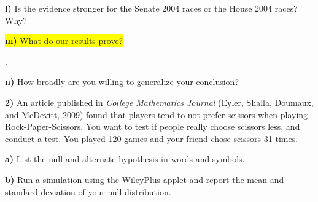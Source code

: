 \documentclass{article}
\newif\ifPrintSolution
\newcommand{\sol}[1]{\ifPrintSolution {\color{blue} #1 } \fi}
\begin{document}
\hspace{0.1in} \textbf{l) } Is the evidence stronger for the Senate 2004 races or the House 2004 races? Why?

\sol{The evidence is stronger for the House races - this is because the sample size is significantly larger (279 compared to 32)}


\vspace{0.25in}

\hspace{0.1in} \colorbox{yellow}{\textbf{m) } What do our results prove?}

\sol{Our results \textbf{do not prove anything}, but provide (strong) strong evidence that the proportion of candidates that appear more competent who win their election is not 50$\%$}.

\vspace{0.25in} 

\hspace{0.1in} \textbf{n) } How broadly are you willing to generalize your conclusion?

\sol{This result is specific to naive voters at Princeton University and cannot be generalized outside of that population based solely on these results. Princeton Students may not be representative of the total voting population to determine elections.}

\pagebreak

\textbf{2) } An article published in \textit{College Mathematics Journal} (Eyler, Shalla, Doumaux, and McDevitt, 2009) found that players tend to not prefer scissors when playing Rock-Paper-Scissors. You want to test if people really choose scissors less, and conduct a test. You played 120 games and your friend chose scissors 31 times.

\hspace{0.1in} \textbf{a) } List the null and alternate hypothesis in words and symbols.

\sol{$H_0: \pi = 0.3333$. The true proportion of times that a person choose scissors in Rock-Paper-Scissors is $\frac{1}{3}$.\\
$H_a: \pi < 0.333$. The true proportion fo times that a person chooses scissors in Rock-Paper-Scissors is less than $\frac{1}{3}$.}

\vspace{0.25in}

\hspace{0.1in} \textbf{b) } Run a simulation using the WileyPlus applet and report the mean and standard deviation of your null distribution.
\end{document}
